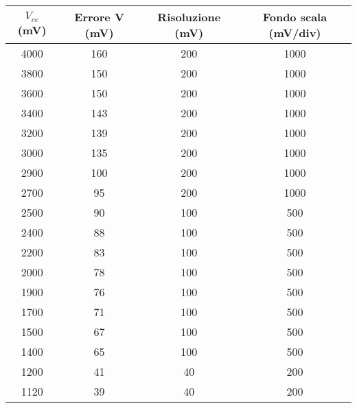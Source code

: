 \documentclass{article}
\begin{document}
\begin{table}[H]
    \centering
    \begin{tabular}{|c|c|c|c|}
        \hline
        $V_{ce}$ (mV) & Errore V (mV) & Risoluzione (mV) & Fondo scala (mV/div) \\ \hline
        4000          & 160           & 200              & 1000                 \\ \hline
        3800          & 150           & 200              & 1000                 \\ \hline
        3600          & 150           & 200              & 1000                 \\ \hline
        3400          & 143           & 200              & 1000                 \\ \hline
        3200          & 139           & 200              & 1000                 \\ \hline
        3000          & 135           & 200              & 1000                 \\ \hline
        2900          & 100           & 200              & 1000                 \\ \hline
        2700          & 95            & 200              & 1000                 \\ \hline
        2500          & 90            & 100              & 500                  \\ \hline
        2400          & 88            & 100              & 500                  \\ \hline
        2200          & 83            & 100              & 500                  \\ \hline
        2000          & 78            & 100              & 500                  \\ \hline
        1900          & 76            & 100              & 500                  \\ \hline
        1700          & 71            & 100              & 500                  \\ \hline
        1500          & 67            & 100              & 500                  \\ \hline
        1400          & 65            & 100              & 500                  \\ \hline
        1200          & 41            & 40               & 200                  \\ \hline
        1120          & 39            & 40               & 200                  \\ \hline

\end{tabular}
\end{table}
\end{document}
